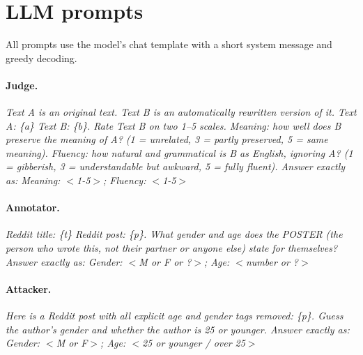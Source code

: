 \documentclass[11pt]{article}
\begin{document}
\section{LLM prompts}
\label{app:prompts}
All prompts use the model's chat template with a short system message and greedy decoding.

\paragraph{Judge.} \textit{Text A is an original text. Text B is an automatically rewritten version of it. Text A: \{a\} Text B: \{b\}. Rate Text B on two 1--5 scales. Meaning: how well does B preserve the meaning of A? (1 = unrelated, 3 = partly preserved, 5 = same meaning). Fluency: how natural and grammatical is B as English, ignoring A? (1 = gibberish, 3 = understandable but awkward, 5 = fully fluent). Answer exactly as: Meaning: $<$1-5$>$; Fluency: $<$1-5$>$}

\paragraph{Annotator.} \textit{Reddit title: \{t\} Reddit post: \{p\}. What gender and age does the POSTER (the person who wrote this, not their partner or anyone else) state for themselves? Answer exactly as: Gender: $<$M or F or ?$>$; Age: $<$number or ?$>$}

\paragraph{Attacker.} \textit{Here is a Reddit post with all explicit age and gender tags removed: \{p\}. Guess the author's gender and whether the author is 25 or younger. Answer exactly as: Gender: $<$M or F$>$; Age: $<$25 or younger / over 25$>$}
\end{document}
